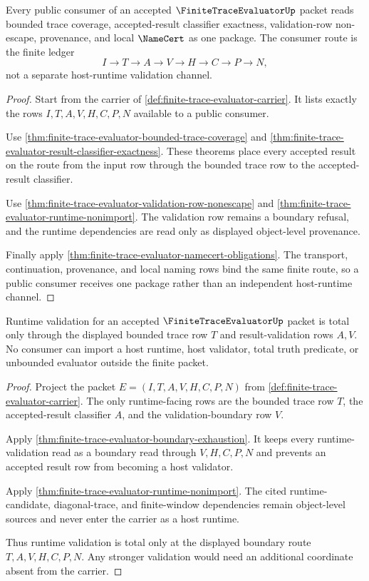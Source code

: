 \begin{theorem}
\label{thm:finite-trace-evaluator-public-consumer-package}
Every public consumer of an accepted $\FiniteTraceEvaluatorUp$ packet reads
bounded trace coverage, accepted-result classifier exactness,
validation-row non-escape, provenance, and local $\NameCert$ as one package.
The consumer route is the finite ledger
$$
I \to T \to A \to V \to H \to C \to P \to N,
$$
not a separate host-runtime validation channel.
\end{theorem}
\begin{proof}
Start from the carrier of \autoref{def:finite-trace-evaluator-carrier}. It
lists exactly the rows $I,T,A,V,H,C,P,N$ available to a public consumer.

Use \autoref{thm:finite-trace-evaluator-bounded-trace-coverage} and
\autoref{thm:finite-trace-evaluator-result-classifier-exactness}. These
theorems place every accepted result on the route from the input row through
the bounded trace row to the accepted-result classifier.

Use \autoref{thm:finite-trace-evaluator-validation-row-nonescape} and
\autoref{thm:finite-trace-evaluator-runtime-nonimport}. The validation row
remains a boundary refusal, and the runtime dependencies are read only as
displayed object-level provenance.

Finally apply \autoref{thm:finite-trace-evaluator-namecert-obligations}. The
transport, continuation, provenance, and local naming rows bind the same
finite route, so a public consumer receives one package rather than an
independent host-runtime channel.
\end{proof}

\begin{theorem}
\label{thm:finite-trace-evaluator-runtime-boundary-totality}
Runtime validation for an accepted $\FiniteTraceEvaluatorUp$ packet is total
only through the displayed bounded trace row $T$ and result-validation rows
$A,V$. No consumer can import a host runtime, host validator, total truth
predicate, or unbounded evaluator outside the finite packet.
\end{theorem}
\begin{proof}
Project the packet $E=(I,T,A,V,H,C,P,N)$ from
\autoref{def:finite-trace-evaluator-carrier}. The only runtime-facing rows
are the bounded trace row $T$, the accepted-result classifier $A$, and the
validation-boundary row $V$.

Apply \autoref{thm:finite-trace-evaluator-boundary-exhaustion}. It keeps every
runtime-validation read as a boundary read through $V,H,C,P,N$ and prevents an
accepted result row from becoming a host validator.

Apply \autoref{thm:finite-trace-evaluator-runtime-nonimport}. The cited
runtime-candidate, diagonal-trace, and finite-window dependencies remain
object-level sources and never enter the carrier as a host runtime.

Thus runtime validation is total only at the displayed boundary route
$T,A,V,H,C,P,N$. Any stronger validation would need an additional coordinate
absent from the carrier.
\end{proof}

